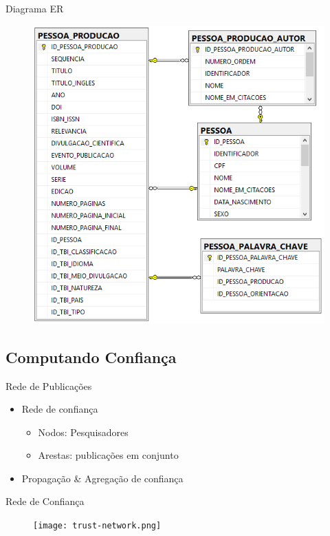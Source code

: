 \documentclass{beamer}
\begin{document}
\begin{frame}{Diagrama ER}{}
  \begin{figure}[ht]
    \includegraphics[width=.65\textwidth]{database.png}
  \end{figure}
\end{frame}

\subsection{Computando Confiança}

\begin{frame}{Rede de Publicações}{}

  \begin{itemize}
    \item Rede de confiança
    \begin{itemize}
      \item Nodos: Pesquisadores
      \item Arestas: publicações em conjunto
    \end{itemize}
    \item Propagação \& Agregação de confiança
  \end{itemize}
  
\end{frame}

\begin{frame}{Rede de Confiança}{}
  \begin{figure}[ht]
    \texttt{[image: trust-network.png]}
  \end{figure}
\end{frame}
\end{document}

